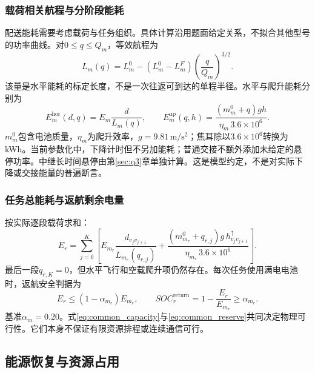 \subsubsection{载荷相关航程与分阶段能耗}
配送能耗需要考虑载荷与任务组织\cite{zhang2021energy,zhang2023corrigendum}。具体计算沿用题面给定关系，不拟合其他型号的功率曲线。对$0\le q\le Q_m$，等效航程为
\begin{equation}
 L_m(q)=L_m^0-(L_m^0-L_m^F)\left(\frac q{Q_m}\right)^{3/2}.
\label{eq:common_range}
\end{equation}
该量是水平能耗的标定长度，不是一次往返可到达的单程半径。水平与爬升能耗分别为
\begin{equation}
 E_m^{\mathrm{hor}}(d,q)=E_m\frac d{L_m(q)},\qquad
 E_m^{\mathrm{up}}(q,h)=\frac{(m_m^0+q)gh}{\eta_m\,3.6\times10^6}.
\label{eq:common_energy_parts}
\end{equation}
$m_m^0$包含电池质量，$\eta_m$为爬升效率，$g=9.81\,\mathrm{m/s^2}$；焦耳除以$3.6\times10^6$转换为kWh。当前参数化中，下降计时但不另加能耗；普通交接不额外添加未给定的悬停功率。中继长时间悬停由第\ref{sec:q3}章单独计算。这是模型约定，不是对实际下降或交接能量的普遍断言。

\subsubsection{任务总能耗与返航剩余电量}
按实际逐段载荷求和：
\begin{equation}
 E_r=\sum_{j=0}^{K}\left[
 E_{m_r}\frac{d_{v_jv_{j+1}}}{L_{m_r}(q_{r,j})}
 +\frac{(m_{m_r}^0+q_{r,j})g\,h_{v_jv_{j+1}}^{\uparrow}}{\eta_{m_r}\,3.6\times10^6}\right].
\label{eq:common_task_energy}
\end{equation}
最后一段$q_{r,K}=0$，但水平飞行和空载爬升项仍然存在。每次任务使用满电电池时，返航安全判据为
\begin{equation}
 E_r\le(1-\alpha_{m_r})E_{m_r},\qquad
 SOC_r^{\mathrm{return}}=1-\frac{E_r}{E_{m_r}}\ge\alpha_{m_r}.
\label{eq:common_reserve}
\end{equation}
基准$\alpha_m=0.20$。式\eqref{eq:common_capacity}与\eqref{eq:common_reserve}共同决定物理可行性。它们本身不保证有限资源排程或连续通信可行。



\subsection{能源恢复与资源占用}
